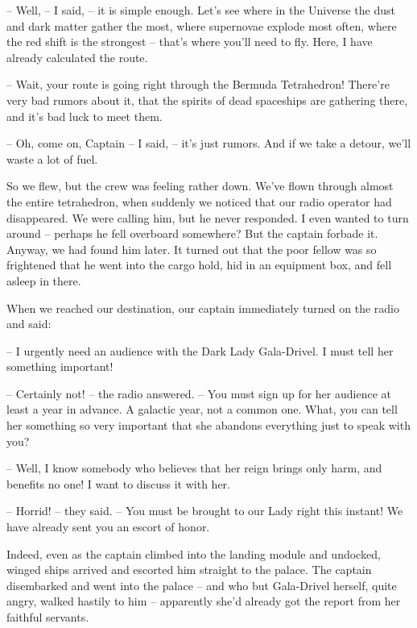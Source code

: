 \documentclass[ebook,twoside,final,openright]{memoir}
\begin{document}
– Well, – I said, – it is simple enough. Let's see where in the Universe the dust and dark matter gather the most, where supernovae explode most often, where the red shift is the strongest – that’s where you’ll need to fly. Here, I have already calculated the route.\par
– Wait, your route is going right through the Bermuda Tetrahedron! There’re very bad rumors about it, that the spirits of dead spaceships are gathering there, and it’s bad luck to meet them.\par
– Oh, come on, Captain – I said, – it’s just rumors. And if we take a detour, we’ll waste a lot of fuel.\par
\par
So we flew, but the crew was feeling rather down. We’ve flown through almost the entire tetrahedron, when suddenly we noticed that our radio operator had disappeared. We were calling him, but he never responded. I even wanted to turn around – perhaps he fell overboard somewhere? But the captain forbade it. Anyway, we had found him later. It turned out that the poor fellow was so frightened that he went into the cargo hold, hid in an equipment box, and fell asleep in there.\par
\par
When we reached our destination, our captain immediately turned on the radio and said:\par
– I urgently need an audience with the Dark Lady Gala-Drivel. I must tell her something important! \par
– Certainly not! – the radio answered. – You must sign up for her audience at least a year in advance. A galactic year, not a common one. What, you can tell her something so very important that she abandons everything just to speak with you?\par
– Well, I know somebody who believes that her reign brings only harm, and benefits no one! I want to discuss it with her.\par
– Horrid! – they said. – You must be brought to our Lady right this instant! We have already sent you an escort of honor.\par
\par
Indeed, even as the captain climbed into the landing module and undocked, winged ships arrived and escorted him straight to the palace. The captain disembarked and went into the palace – and who but Gala-Drivel herself, quite angry, walked hastily to him – apparently she’d already got the report from her faithful servants.\par
\end{document}
